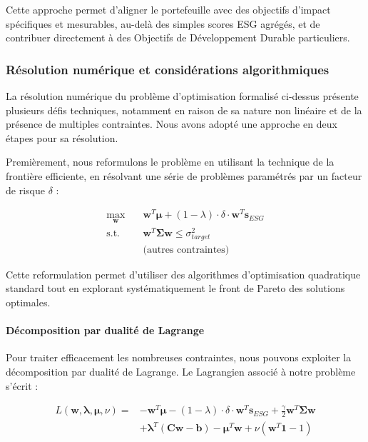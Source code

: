 Cette approche permet d'aligner le portefeuille avec des objectifs d'impact spécifiques et mesurables, au-delà des simples scores ESG agrégés, et de contribuer directement à des Objectifs de Développement Durable particuliers.

\subsubsection{Résolution numérique et considérations algorithmiques}

La résolution numérique du problème d'optimisation formalisé ci-dessus présente plusieurs défis techniques, notamment en raison de sa nature non linéaire et de la présence de multiples contraintes. Nous avons adopté une approche en deux étapes pour sa résolution.

Premièrement, nous reformulons le problème en utilisant la technique de la frontière efficiente, en résolvant une série de problèmes paramétrés par un facteur de risque $\delta$ :

\begin{align}
\max_{\mathbf{w}} \quad & \mathbf{w}^T \boldsymbol{\mu} + (1-\lambda) \cdot \delta \cdot \mathbf{w}^T \mathbf{s}_{ESG} \\
\text{s.t.} \quad & \mathbf{w}^T \boldsymbol{\Sigma} \mathbf{w} \leq \sigma^2_{target} \\
& \text{(autres contraintes)}
\end{align}

Cette reformulation permet d'utiliser des algorithmes d'optimisation quadratique standard tout en explorant systématiquement le front de Pareto des solutions optimales.

\paragraph{Décomposition par dualité de Lagrange}
Pour traiter efficacement les nombreuses contraintes, nous pouvons exploiter la décomposition par dualité de Lagrange. Le Lagrangien associé à notre problème s'écrit :

\begin{align}
L(\mathbf{w}, \boldsymbol{\lambda}, \boldsymbol{\mu}, \nu) = &-\mathbf{w}^T \boldsymbol{\mu} - (1-\lambda) \cdot \delta \cdot \mathbf{w}^T \mathbf{s}_{ESG} + \frac{\gamma}{2}\mathbf{w}^T \boldsymbol{\Sigma} \mathbf{w} \\
&+ \boldsymbol{\lambda}^T (\mathbf{C}\mathbf{w} - \mathbf{b}) - \boldsymbol{\mu}^T \mathbf{w} + \nu(\mathbf{w}^T\mathbf{1} - 1)
\end{align}

